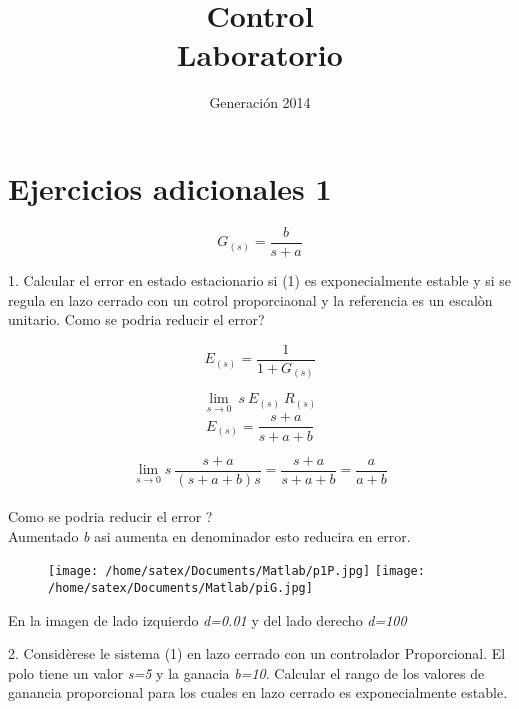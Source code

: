 \documentclass{tufte-book}
\title{Control\\Laboratorio}
\author{Generación 2014}
\numberwithin{equation}{chapter}
\begin{document}
 \maketitle

\section{Ejercicios adicionales 1}
		\begin{equation}
	G_{(s)} = \frac{b}{s+a}
	\end{equation}

1. Calcular el error en estado estacionario si (1) es exponecialmente estable y si se regula en lazo cerrado con un cotrol proporciaonal y la referencia es un escal\`on unitario. Como se podria reducir el error? 

		\begin{equation} 
		E_{(s)} = \frac{1}{ 1 + G_{(s)}} \nonumber  
		\end{equation}	
		
		\begin{equation}
		\lim_{s \rightarrow 0 } \ s \ E_{(s)} \ R_{(s)}	\nonumber
 \end{equation}
		\begin{equation}
		E_{(s)} = \frac{s+a}{s+a+b} \nonumber
			\end{equation}

	
			\begin{equation}
			\lim_{s\rightarrow 0} s \ \frac{s+a}{(s+a+b)s} = \frac{s+a}{s+a+b} = \frac{a}{a+b} \nonumber
\end{equation}
\\
Como se podria reducir el error ? \\ Aumentado \emph{b} asi aumenta en denominador  esto reducira en error.
\\

\begin{figure}[htp]
\centering
\texttt{[image: /home/satex/Documents/Matlab/p1P.jpg]}
\texttt{[image: /home/satex/Documents/Matlab/piG.jpg]}
\end{figure}

En la imagen de lado izquierdo \emph{d=0.01} y del lado derecho \emph{d=100}

2. Consid\`erese le sistema (1) en lazo cerrado con un controlador  Proporcional. El polo tiene un valor \emph{s=5} y la ganacia \emph{b=10}. Calcular el rango de los valores de ganancia proporcional para los cuales en lazo cerrado es exponecialmente estable. 
\end{document}
